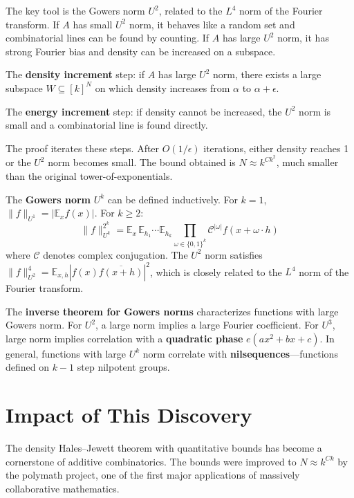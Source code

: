 The key tool is the Gowers norm $U^2$, related to the $L^4$ norm of
the Fourier transform.  If $A$ has small $U^2$ norm, it behaves
like a random set and combinatorial lines can be found by counting.
If $A$ has large $U^2$ norm, it has strong Fourier bias and density
can be increased on a subspace.

The \textbf{density increment} step: if $A$ has large $U^2$ norm,
there exists a large subspace $W\subseteq[k]^N$ on which density
increases from $\alpha$ to $\alpha+\epsilon$.

The \textbf{energy increment} step: if density cannot be increased,
the $U^2$ norm is small and a combinatorial line is found directly.

The proof iterates these steps.  After $O(1/\epsilon)$ iterations,
either density reaches 1 or the $U^2$ norm becomes small.  The bound
obtained is $N\approx k^{Ck^2}$, much smaller than the original
tower-of-exponentials.

The \textbf{Gowers norm} $U^k$ can be defined inductively.  For
$k=1$, $\|f\|_{U^1}=|\mathbb{E}_x f(x)|$.  For $k\geq 2$:
\[
  \|f\|_{U^k}^{2^k}
  = \mathbb{E}_x\,\mathbb{E}_{h_1}\cdots\mathbb{E}_{h_k}
    \prod_{\omega\in\{0,1\}^k}
      \mathcal{C}^{|\omega|}f(x+\omega\cdot h)
\]
where $\mathcal{C}$ denotes complex conjugation.  The $U^2$ norm
satisfies
$\|f\|_{U^2}^4
 = \mathbb{E}_{x,h}|f(x)\overline{f(x+h)}|^2$, which is closely
related to the $L^4$ norm of the Fourier transform.

The \textbf{inverse theorem for Gowers norms} characterizes
functions with large Gowers norm.  For $U^2$, a large norm implies
a large Fourier coefficient.  For $U^3$, large norm implies
correlation with a \textbf{quadratic phase}
$e(ax^2+bx+c)$.  In general, functions with large $U^k$ norm
correlate with \textbf{nilsequences}---functions defined on $k-1$
step nilpotent groups.

\section{Impact of This Discovery}

The density Hales--Jewett theorem with quantitative bounds has
become a cornerstone of additive combinatorics.  The bounds were
improved to $N\approx k^{Ck}$ by the polymath project, one of the
first major applications of massively collaborative mathematics.

